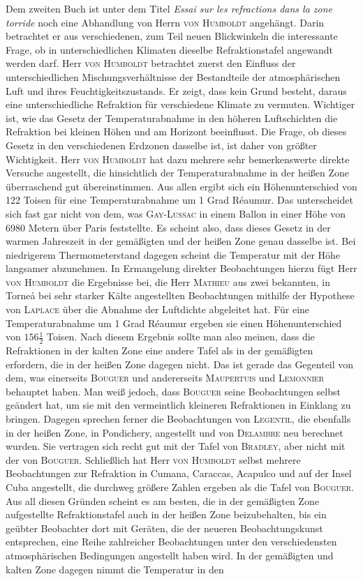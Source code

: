 Dem zweiten Buch ist unter dem Titel \emph{Essai sur les refractions dans la zone torride} noch eine Abhandlung von Herrn \textsc{von Humboldt} angehängt. Darin betrachtet er aus verschiedenen, zum Teil neuen Blickwinkeln die interessante Frage, ob in unterschiedlichen Klimaten dieselbe Refraktionstafel angewandt werden darf. Herr \textsc{von Humboldt} betrachtet zuerst den Einfluss der unterschiedlichen Mischungsverhältnisse der Bestandteile der atmosphärischen Luft und ihres Feuchtigkeitszustands. Er zeigt, dass kein Grund besteht, daraus eine unterschiedliche Refraktion für verschiedene Klimate zu vermuten. Wichtiger ist, wie das Gesetz der Temperaturabnahme in den höheren Luftschichten die Refraktion bei kleinen Höhen und am Horizont beeinflusst. Die Frage, ob dieses Gesetz in den verschiedenen Erdzonen dasselbe ist, ist daher von größter Wichtigkeit. Herr \textsc{von Humboldt} hat dazu mehrere sehr bemerkenswerte direkte Versuche angestellt, die hinsichtlich der Temperaturabnahme in der heißen Zone überraschend gut übereinstimmen. Aus allen ergibt sich ein Höhenunterschied von 122 Toisen für eine Temperaturabnahme um 1 Grad Réaumur. Das unterscheidet sich fast gar nicht von dem, was \textsc{Gay-Lussac} in einem Ballon in einer Höhe von 6980 Metern über Paris feststellte. Es scheint also, dass dieses Gesetz in der warmen Jahreszeit in der gemäßigten und der heißen Zone genau dasselbe ist. Bei niedrigerem Thermometerstand dagegen scheint die Temperatur mit der Höhe langsamer abzunehmen. In Ermangelung direkter Beobachtungen hierzu fügt Herr \textsc{von Humboldt} die Ergebnisse bei, die Herr \textsc{Mathieu} aus zwei bekannten, in Torneå bei sehr starker Kälte angestellten Beobachtungen mithilfe der Hypothese von \textsc{Laplace} über die Abnahme der Luftdichte abgeleitet hat. Für eine Temperaturabnahme um 1 Grad Réaumur ergeben sie einen Höhenunterschied von $156\frac{1}{2}$ Toisen. Nach diesem Ergebnis sollte man also meinen, dass die Refraktionen in der kalten Zone eine andere Tafel als in der gemäßigten erfordern, die in der heißen Zone dagegen nicht. Das ist gerade das Gegenteil von dem, was einerseits \textsc{Bouguer} und andererseits \textsc{Maupertuis} und \textsc{Lemonnier} behauptet haben. Man weiß jedoch, dass \textsc{Bouguer} seine Beobachtungen selbst geändert hat, um sie mit den vermeintlich kleineren Refraktionen in Einklang zu bringen. Dagegen sprechen ferner die Beobachtungen von \textsc{Legentil}, die ebenfalls in der heißen Zone, in Pondichery, angestellt und von \textsc{Delambre} neu berechnet wurden. Sie vertragen sich recht gut mit der Tafel von \textsc{Bradley}, aber nicht mit der von \textsc{Bouguer}. Schließlich hat Herr \textsc{von Humboldt} selbst mehrere Beobachtungen zur Refraktion in Cumana, Caraccas, Acapulco und auf der Insel Cuba angestellt, die durchweg größere Zahlen ergeben als die Tafel von \textsc{Bouguer}. Aus all diesen Gründen scheint es am besten, die in der gemäßigten Zone aufgestellte Refraktionstafel auch in der heißen Zone beizubehalten, bis ein geübter Beobachter dort mit Geräten, die der neueren Beobachtungskunst entsprechen, eine Reihe zahlreicher Beobachtungen unter den verschiedensten atmosphärischen Bedingungen angestellt haben wird. In der gemäßigten und kalten Zone dagegen nimmt die Temperatur in den 